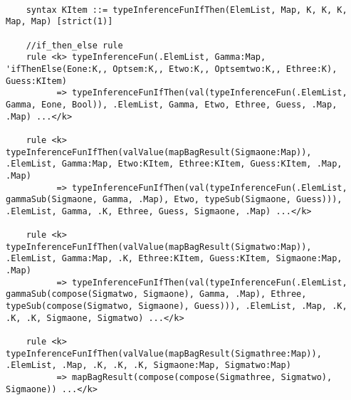 \begin{prooftree}
\end{prooftree}

\begin{lstlisting}

    syntax KItem ::= typeInferenceFunIfThen(ElemList, Map, K, K, K, Map, Map) [strict(1)]

    //if_then_else rule
    rule <k> typeInferenceFun(.ElemList, Gamma:Map, 'ifThenElse(Eone:K,, Optsem:K,, Etwo:K,, Optsemtwo:K,, Ethree:K), Guess:KItem)
          => typeInferenceFunIfThen(val(typeInferenceFun(.ElemList, Gamma, Eone, Bool)), .ElemList, Gamma, Etwo, Ethree, Guess, .Map, .Map) ...</k>

    rule <k> typeInferenceFunIfThen(valValue(mapBagResult(Sigmaone:Map)), .ElemList, Gamma:Map, Etwo:KItem, Ethree:KItem, Guess:KItem, .Map, .Map)
          => typeInferenceFunIfThen(val(typeInferenceFun(.ElemList, gammaSub(Sigmaone, Gamma, .Map), Etwo, typeSub(Sigmaone, Guess))), .ElemList, Gamma, .K, Ethree, Guess, Sigmaone, .Map) ...</k>

    rule <k> typeInferenceFunIfThen(valValue(mapBagResult(Sigmatwo:Map)), .ElemList, Gamma:Map, .K, Ethree:KItem, Guess:KItem, Sigmaone:Map, .Map)
          => typeInferenceFunIfThen(val(typeInferenceFun(.ElemList, gammaSub(compose(Sigmatwo, Sigmaone), Gamma, .Map), Ethree, typeSub(compose(Sigmatwo, Sigmaone), Guess))), .ElemList, .Map, .K, .K, .K, Sigmaone, Sigmatwo) ...</k>

    rule <k> typeInferenceFunIfThen(valValue(mapBagResult(Sigmathree:Map)), .ElemList, .Map, .K, .K, .K, Sigmaone:Map, Sigmatwo:Map)
          => mapBagResult(compose(compose(Sigmathree, Sigmatwo), Sigmaone)) ...</k>
          
\end{lstlisting}

\begin{prooftree}
\end{prooftree}

